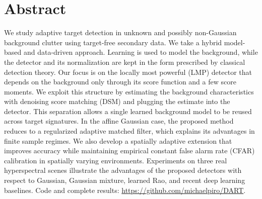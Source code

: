 \chapter*{Abstract}

We study adaptive target detection in unknown and possibly non-Gaussian background clutter using target-free secondary data. We take a hybrid model-based and data-driven approach. Learning is used to model the background, while the detector and its normalization are kept in the form prescribed by classical detection theory. Our focus is on the locally most powerful (LMP) detector that depends on the background only through its score function and a few score moments. We exploit this structure by estimating the background characteristics with denoising score matching (DSM) and plugging the estimate into the detector. This separation allows a single learned background model to be reused across target signatures. In the affine Gaussian case, the proposed method reduces to a regularized adaptive matched filter, which explains its advantages in finite sample regimes. We also develop a spatially adaptive extension that improves accuracy while maintaining empirical constant false alarm rate (CFAR) calibration in spatially varying environments.
Experiments on three real hyperspectral scenes illustrate the advantages of the proposed detectors with respect to Gaussian, Gaussian mixture, learned Rao, and recent deep learning baselines. Code and complete results: \url{https://github.com/michaelpiro/DART}.